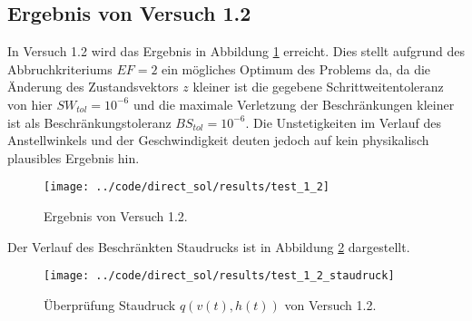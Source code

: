 \subsection{Ergebnis von Versuch 1.2}\label{kap:Versuch12}
In Versuch 1.2 wird das Ergebnis in Abbildung \ref{img:test_1_2} erreicht. Dies stellt aufgrund des Abbruchkriteriums $EF = 2$ ein mögliches Optimum des Problems da, da die Änderung des Zustandsvektors $z$ kleiner ist die gegebene Schrittweitentoleranz von hier $SW_{tol} = 10^{-6}$ und die maximale Verletzung der Beschränkungen kleiner ist als Beschränkungstoleranz $BS_{tol} = 10^{-6}$. Die Unstetigkeiten im Verlauf des Anstellwinkels und der Geschwindigkeit deuten jedoch auf kein physikalisch plausibles Ergebnis hin.
\begin{figure}[H]
\begin{center}
\texttt{[image: ../code/direct\_sol/results/test\_1\_2]}
\caption{Ergebnis von Versuch 1.2.}\label{img:test_1_2}
\end{center}
\end{figure}
Der Verlauf des Beschränkten Staudrucks ist in Abbildung \ref{img:test_1_2_staudruck} dargestellt.
\begin{figure}[H]
\begin{center}
\texttt{[image: ../code/direct\_sol/results/test\_1\_2\_staudruck]}
\caption{Überprüfung Staudruck $q(v(t),h(t))$ von Versuch 1.2.}\label{img:test_1_2_staudruck}
\end{center}
\end{figure}
















\newpage
